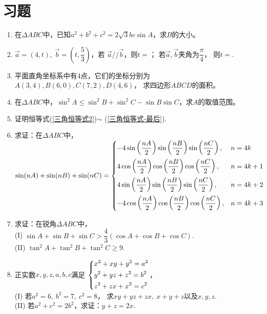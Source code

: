 \section{习题}
\begin{enumerate}[label={\textbf{\thechapter.\arabic*}},leftmargin=
    \inteval{\myenumleftmargin}pt]
    
\item 在$ \Delta ABC $中，已知$ a^2+b^2+c^2=2\sqrt{3}bc\sin A $，求$ B $的大小。

\item $ \vec{a}=(4,t),\ \vec{b}=\left(t,\dfrac{5}{3}\right) $，若
$ \vec{a}//\vec{b} $，则$ t= $\underline{\hspace{2cm}}；
若$ \vec{a},\vec{b} $夹角为$ \dfrac{\pi}{4} $，
则$ t= $\underline{\hspace{2cm}}.

\item 平面直角坐标系中有4点，它们的坐标分别为$ A(3,4),B(6,0),C(7,2),D(4,6) $，
求四边形$ ABCD $的面积。

\item 在$ \Delta ABC $中，$ \sin^2A\leq\sin^2B+\sin^2C-
\sin B\sin C $，求$ A $的取值范围。

\item 证明恒等式(\ref{三角恒等式2})$ \sim $ (\ref{三角恒等式-最后}).

\item 求证：在$ \Delta ABC $中，\\ $ \sin (nA) +\sin (nB) +\sin (nC)=
\begin{dcases}
    - 4\sin\left(\dfrac{nA}{2}\right)\sin\left(\dfrac{nB}{2}\right)
    \sin\left(\dfrac{nC}{2}\right),& n=4k \\
    4\cos\left(\dfrac{nA}{2}\right)\cos\left(\dfrac{nB}{2}\right)
    \cos\left(\dfrac{nC}{2}\right),& n=4k+1 \\
    4\sin\left(\dfrac{nA}{2}\right)\sin\left(\dfrac{nB}{2}\right)
    \sin\left(\dfrac{nC}{2}\right),& n=4k+2 \\
    - 4\cos\left(\dfrac{nA}{2}\right)\cos\left(\dfrac{nB}{2}\right)
    \cos\left(\dfrac{nC}{2}\right),& n=4k+3
\end{dcases} $

\item 求证：在锐角$ \Delta ABC $中，\\
(I) $ \sin A +\sin B +\sin C > \dfrac{4}{3} (\cos A +\cos B +\cos C) $. \\
(II) $ \tan^2 A+\tan^2 B +\tan^2 C \geq 9 $.

\item 正实数$ x,y,z,a,b,c $满足
$ \begin{dcases} 
    x^2+xy+y^2= a^2 \\
    y^2+yz+z^2= b^2 \\
    z^2+zx+x^2= c^2  
\end{dcases} $，\\
(I) 若$ a^2=6,\ b^2=7,\ c^2=8 $，
求$ xy+yz+zx,\ x+y+z $以及$x,y,z$. \\
(II) 若$a^2+c^2=2b^2$，求证：$ y+z=2x $.


\end{enumerate}
